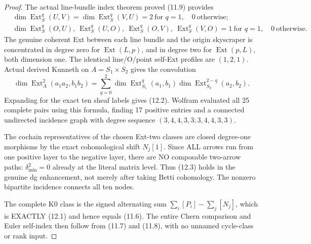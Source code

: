 \documentclass[11pt,a4paper]{article}
\begin{document}
\begin{proof}
The actual
line-bundle
index theorem
proved (11.9)
provides
\[
 \begin{aligned}
 &\dim\operatorname{Ext}^q_S(U,V)
 =\dim\operatorname{Ext}^q_S(V,U)
   =2\ \text{for }q=1,\quad0\ \text{otherwise};\\
 &\dim\operatorname{Ext}^q_S
 (O,U),\ \operatorname{Ext}^q_S(U,O),
 \ \operatorname{Ext}^q_S(O,V),
 \ \operatorname{Ext}^q_S(V,O)
  =1\ \text{for }q=1,\quad0\ \text{otherwise}.
 \end{aligned}
\]
The genuine
coherent Ext
between each
line bundle
and the
origin skyscraper
is concentrated
in degree zero
for
\(\operatorname{Ext}(L,p)\),
and in degree two
for
\(\operatorname{Ext}(p,L)\),
both dimension one.
The identical
line/O/point
self-Ext
profiles are
\((1,2,1)\).
Actual derived
Kunneth on
\(A=S_1\times S_2\)
gives the
convolution
\[
 \dim\operatorname{Ext}^2_A
 (a_1a_2,b_1b_2)
 =\sum_{q=0}^{2}
   \dim\operatorname{Ext}^q_{S_1}
                  (a_1,b_1)
   \dim\operatorname{Ext}^{2-q}_{S_2}
                  (a_2,b_2).
\]
Expanding
for the exact
ten sheaf labels
gives (12.2).
Wolfram evaluated
all 25 complete
pairs using
this formula,
finding 17
positive
entries and
a connected
undirected
incidence graph
with degree sequence
\((3,4,4,3,3;3,4,4,3,3)\).

The cochain
representatives
of the chosen
Ext-two classes
are closed
degree-one
morphisms
by the exact
cohomological
shift \(N_j[1]\).
Since ALL arrows
run from one
positive layer
to the
negative layer,
there are
NO composable
two-arrow paths:
\(\delta_{\min}^2=0\)
already at
the literal
matrix level.
Thus (12.3)
holds in the
genuine dg
enhancement,
not merely
after taking
Betti cohomology.
The nonzero
bipartite
incidence
connects all
ten nodes.

The complete
K0 class
is the
signed alternating
sum
\(\sum_i[P_i]-\sum_j[N_j]\),
which is
EXACTLY
(12.1) and
hence equals
(11.6).
The entire
Chern
comparison
and Euler
self-index
then follow
from (11.7)
and (11.8),
with no
unnamed
cycle-class
or rank
input.
\end{proof}
\end{document}
